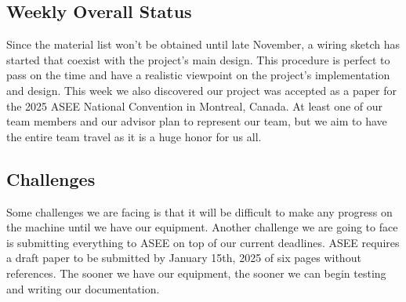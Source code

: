 
\subsection{Weekly Overall Status}
Since the material list won't be obtained until late November, a wiring sketch has started that coexist with the project's main design. This procedure is perfect to pass on the time and have a realistic viewpoint on the project's implementation and design. This week we also discovered our project was accepted as a paper for the 2025 ASEE National Convention in Montreal, Canada. At least one of our team members and our advisor plan to represent our team, but we aim to have the entire team travel as it is a huge honor for us all.\par

\subsection{Challenges}
Some challenges we are facing is that it will be difficult to make any progress on the machine until we have our equipment. Another challenge we are going to face is submitting everything to ASEE on top of our current deadlines. ASEE requires a draft paper to be submitted by January 15th, 2025 of six pages without references. The sooner we have our equipment, the sooner we can begin testing and writing our documentation.

